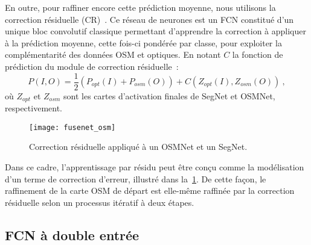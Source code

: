 En outre, pour raffiner encore cette prédiction moyenne, nous utilisons la correction résiduelle (CR)~\cite{audebert_semantic_2016}. Ce réseau de neurones est un FCN constitué d'un unique bloc convolutif classique permettant d'apprendre la correction à appliquer à la prédiction moyenne, cette fois-ci pondérée par classe, pour exploiter la complémentarité des données OSM et optiques. En notant $C$ la fonction de prédiction du module de correction résiduelle~:
\begin{equation}
P(I, O) = \frac{1}{2} (P_{opt}(I) + P_{osm}(O)) + C(Z_{opt}(I), Z_{osm}(O))~,
\end{equation}
où $Z_{opt}$ et $Z_{osm}$ sont les cartes d'activation finales de SegNet et OSMNet, respectivement.

\begin{figure}[t]
  \texttt{[image: fusenet\_osm]}
  \caption{Correction résiduelle appliqué à un OSMNet et un SegNet.}
  \label{fig:refinet}
\end{figure}

Dans ce cadre, l'apprentissage par résidu peut être conçu comme la modélisation d'un terme de correction d'erreur, illustré dans la~\cref{fig:refinet}. De cette façon, le raffinement de la carte OSM de départ est elle-même raffinée par la correction résiduelle selon un processus itératif à deux étapes.

\subsection{FCN à double entrée}

